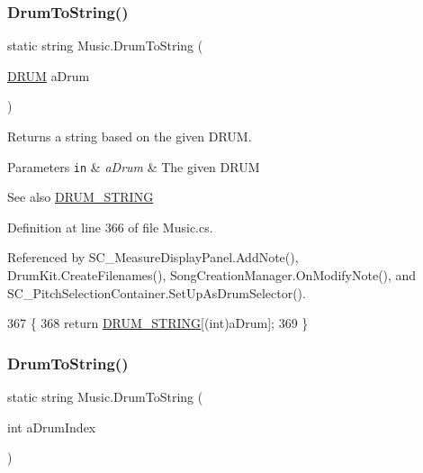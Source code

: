 \subsubsection{\texorpdfstring{Drum\+To\+String()}{DrumToString()}\hspace{0.1cm}{\footnotesize\ttfamily [1/2]}}
{\footnotesize\ttfamily static string Music.\+Drum\+To\+String (\begin{DoxyParamCaption}\item[{\hyperlink{group___music_enums_gade475b4382c7066d1af13e7c13c029b6}{D\+R\+UM}}]{a\+Drum }\end{DoxyParamCaption})\hspace{0.3cm}{\ttfamily [static]}}



Returns a string based on the given D\+R\+UM. 


\begin{DoxyParams}[1]{Parameters}
\mbox{\tt in}  & {\em a\+Drum} & The given D\+R\+UM\\
\hline
\end{DoxyParams}
\begin{DoxySeeAlso}{See also}
\hyperlink{group___music_constants_ga1381281d147886a2cf3584ab0c7a67d6}{D\+R\+U\+M\+\_\+\+S\+T\+R\+I\+NG} 
\end{DoxySeeAlso}


Definition at line 366 of file Music.\+cs.



Referenced by S\+C\+\_\+\+Measure\+Display\+Panel.\+Add\+Note(), Drum\+Kit.\+Create\+Filenames(), Song\+Creation\+Manager.\+On\+Modify\+Note(), and S\+C\+\_\+\+Pitch\+Selection\+Container.\+Set\+Up\+As\+Drum\+Selector().


\begin{DoxyCode}
367     \{
368         \textcolor{keywordflow}{return} \hyperlink{group___music_constants_ga1381281d147886a2cf3584ab0c7a67d6}{DRUM\_STRING}[(int)aDrum];
369     \}
\end{DoxyCode}
\mbox{\label{group___music_stat_func_gab74179676b93b41cde2d1cc18af0e788}} 
\subsubsection{\texorpdfstring{Drum\+To\+String()}{DrumToString()}\hspace{0.1cm}{\footnotesize\ttfamily [2/2]}}
{\footnotesize\ttfamily static string Music.\+Drum\+To\+String (\begin{DoxyParamCaption}\item[{int}]{a\+Drum\+Index }\end{DoxyParamCaption})\hspace{0.3cm}{\ttfamily [static]}}



